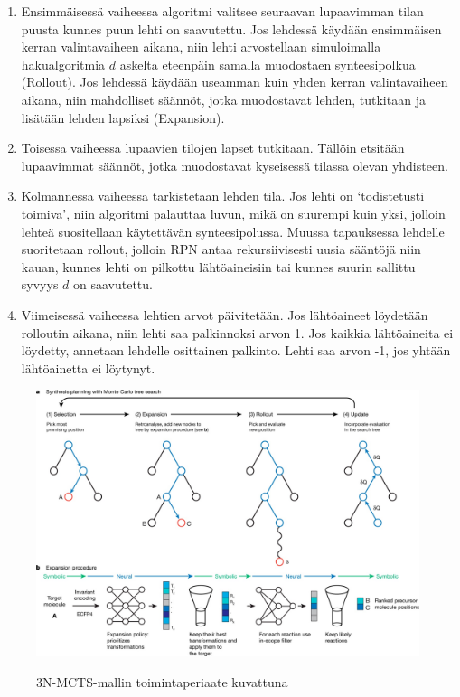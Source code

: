 \documentclass[finnish,twoside,censored,tkt,sw-line]{HYthesisML}
\begin{document}
\begin{enumerate}
    \item Ensimmäisessä vaiheessa algoritmi valitsee seuraavan lupaavimman tilan puusta kunnes puun lehti on saavutettu.
          Jos lehdessä käydään ensimmäisen kerran valintavaiheen aikana, niin lehti arvostellaan simuloimalla hakualgoritmia \(d\) askelta eteenpäin samalla muodostaen synteesipolkua (Rollout).
          Jos lehdessä käydään useamman kuin yhden kerran valintavaiheen aikana, niin mahdolliset säännöt, jotka muodostavat lehden, tutkitaan ja lisätään lehden lapsiksi (Expansion).

    \item Toisessa vaiheessa lupaavien tilojen lapset tutkitaan.
          Tällöin etsitään lupaavimmat säännöt, jotka muodostavat kyseisessä tilassa olevan yhdisteen.

    \item Kolmannessa vaiheessa tarkistetaan lehden tila.
          Jos lehti on `todistetusti toimiva', niin algoritmi palauttaa luvun, mikä on suurempi kuin yksi, jolloin lehteä suositellaan käytettävän synteesipolussa.
          Muussa tapauksessa lehdelle suoritetaan rollout, jolloin RPN antaa rekursiivisesti uusia sääntöjä niin kauan, kunnes lehti on pilkottu lähtöaineisiin tai kunnes suurin sallittu syvyys \(d\) on saavutettu.

    \item Viimeisessä vaiheessa lehtien arvot päivitetään.
          Jos lähtöaineet löydetään rolloutin aikana, niin lehti saa palkinnoksi arvon 1.
          Jos kaikkia lähtöaineita ei löydetty, annetaan lehdelle osittainen palkinto.
          Lehti saa arvon -1, jos yhtään lähtöainetta ei löytynyt.
\end{enumerate}

\begin{figure}[!ht]
    \centering
    \includegraphics[width=\textwidth]{3N-MCTS-fig.jpg}
    \caption{3N-MCTS-mallin toimintaperiaate kuvattuna}
    {\cite{SeglerMarwinHS2018Pcsw}}
    {\label{fig:3n-mcts-model}}
\end{figure}
\end{document}
